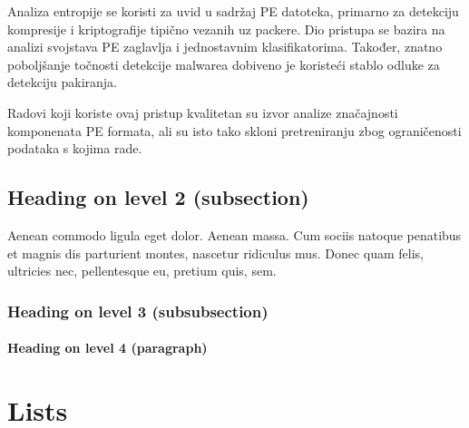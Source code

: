\documentclass[paper=a4, fontsize=11pt]{scrartcl} %
\numberwithin{equation}{section} %
\numberwithin{figure}{section} %
\numberwithin{table}{section} %
\begin{document}
Analiza entropije se koristi za uvid u sadržaj PE datoteka, primarno za detekciju kompresije i kriptografije tipično vezanih uz packere.
Dio pristupa se bazira na analizi svojstava PE zaglavlja i jednostavnim klasifikatorima. Također, znatno poboljšanje točnosti detekcije malwarea dobiveno je koristeći stablo odluke za detekciju pakiranja.

\vspace{3mm}

Radovi koji koriste ovaj pristup kvalitetan su izvor analize značajnosti komponenata PE formata, ali su isto
tako skloni pretreniranju zbog ograničenosti podataka s kojima rade. 


\iffalse
\subsection{Heading on level 2 (subsection)}

Aenean commodo ligula eget dolor. Aenean massa. Cum sociis natoque penatibus et magnis dis parturient montes, nascetur ridiculus mus. Donec quam felis, ultricies nec, pellentesque eu, pretium quis, sem.


\subsubsection{Heading on level 3 (subsubsection)}

\lipsum[3] %

\paragraph{Heading on level 4 (paragraph)}

\lipsum[6] %


\section{Lists}

\end{document}
